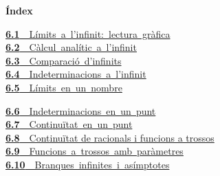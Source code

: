 \documentclass[11pt,a4paper]{article}
\begin{document}
\begin{tcolorbox}[colback=fmsurface,colframe=fmsurface,arc=3mm,left=4mm,right=4mm,top=2mm,bottom=2mm]
\small\textbf{Índex}\par\smallskip
\begin{minipage}[t]{0.49\linewidth}\small \mbox{\hyperlink{sec1}{\textbf{\color{fmgreen}6.1}\ \ Límits a l'infinit: lectura gràfica}}\\[3pt]
\mbox{\hyperlink{sec2}{\textbf{\color{fmgreen}6.2}\ \ Càlcul analític a l'infinit}}\\[3pt]
\mbox{\hyperlink{sec3}{\textbf{\color{fmgreen}6.3}\ \ Comparació d'infinits}}\\[3pt]
\mbox{\hyperlink{sec4}{\textbf{\color{fmgreen}6.4}\ \ Indeterminacions a l'infinit}}\\[3pt]
\mbox{\hyperlink{sec5}{\textbf{\color{fmgreen}6.5}\ \ Límits en un nombre}}\\[3pt]\end{minipage}\hfill\begin{minipage}[t]{0.49\linewidth}\small \mbox{\hyperlink{sec6}{\textbf{\color{fmgreen}6.6}\ \ Indeterminacions en un punt}}\\[3pt]
\mbox{\hyperlink{sec7}{\textbf{\color{fmgreen}6.7}\ \ Continuïtat en un punt}}\\[3pt]
\hyperlink{sec8}{\textbf{\color{fmgreen}6.8}\ \ Continuïtat de racionals i funcions a trossos}\\[3pt]
\mbox{\hyperlink{sec9}{\textbf{\color{fmgreen}6.9}\ \ Funcions a trossos amb paràmetres}}\\[3pt]
\mbox{\hyperlink{sec10}{\textbf{\color{fmgreen}6.10}\ \ Branques infinites i asímptotes}}\\[3pt]\end{minipage}
\end{tcolorbox}

\Needspace{5.7cm}
\end{document}
